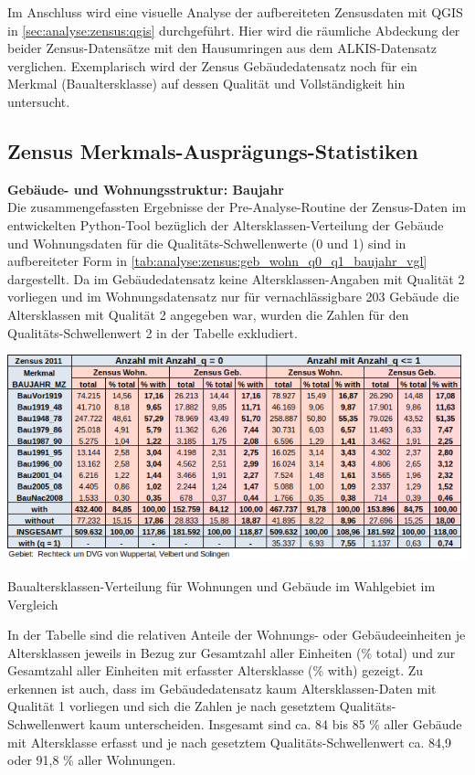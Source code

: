 		Im Anschluss wird eine visuelle Analyse der aufbereiteten Zensusdaten mit QGIS in \autoref{sec:analyse:zensus:qgis} durchgeführt. Hier wird die räumliche Abdeckung der beider Zensus-Datensätze mit den Hausumringen aus dem ALKIS-Datensatz verglichen. Exemplarisch wird der Zensus Gebäudedatensatz noch für ein Merkmal (Baualtersklasse) auf dessen Qualität und Vollständigkeit hin untersucht.
		

		\subsection{Zensus Merkmals-Ausprägungs-Statistiken}
		\label{sec:analyse:zensus:preanalyse}
			
			\textbf{Gebäude- und Wohnungsstruktur: Baujahr}\\
			Die zusammengefassten Ergebnisse der Pre-Analyse-Routine der Zensus-Daten im entwickelten Python-Tool bezüglich der Altersklassen-Verteilung der Gebäude und Wohnungsdaten für die Qualitäts-Schwellenwerte (0 und 1) sind in aufbereiteter Form in \autoref{tab:analyse:zensus:geb_wohn_q0_q1_baujahr_vgl} dargestellt. Da im Gebäudedatensatz keine Altersklassen-Angaben mit Qualität 2 vorliegen und im Wohnungsdatensatz nur für vernachlässigbare 203 Gebäude die Altersklassen mit Qualität 2 angegeben war, wurden die Zahlen für den Qualitäts-Schwellenwert 2 in der Tabelle exkludiert. 
			
			\begin{table}[h]
				\includegraphics[width=\linewidth]{./Medien/tables/Zensus_geb_wohn_analysis_q0_q1_baujahr_vgl.png}
				\caption{Baualtersklassen-Verteilung für Wohnungen und Gebäude im Wahlgebiet im Vergleich}
				\label{tab:analyse:zensus:geb_wohn_q0_q1_baujahr_vgl}
			\end{table}
			
			In der Tabelle sind die relativen Anteile der Wohnungs- oder Gebäudeeinheiten je Altersklassen jeweils in Bezug zur Gesamtzahl aller Einheiten (\% total) und zur Gesamtzahl aller Einheiten mit erfasster Altersklasse (\% with) gezeigt. Zu erkennen ist auch, dass im Gebäudedatensatz kaum Altersklassen-Daten mit Qualität 1 vorliegen und sich die Zahlen je nach gesetztem Qualitäts-Schwellenwert kaum unterscheiden. Insgesamt sind ca. 84 bis 85 \% aller Gebäude mit Altersklasse erfasst und je nach gesetztem Qualitäts-Schwellenwert ca. 84,9 oder 91,8 \% aller Wohnungen. 
			
